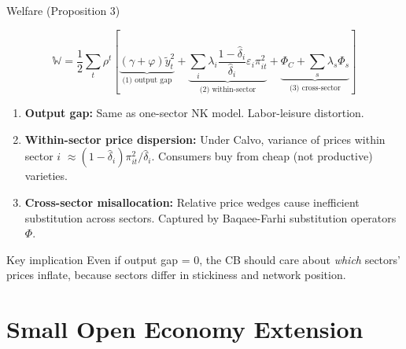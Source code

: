 \documentclass[aspectratio=169]{beamer}
\begin{document}
\begin{frame}{Welfare (Proposition 3)}

\begin{equation*}
    \mathbb{W} = \frac{1}{2}\sum_t \rho^t \left[\underbrace{(\gamma+\varphi)\tilde{y}_t^2}_{\text{(1) output gap}} + \underbrace{\sum_i \lambda_i \frac{1-\hat{\delta}_i}{\hat{\delta}_i}\varepsilon_i\pi_{it}^2}_{\text{(2) within-sector}} + \underbrace{\Phi_C + \sum_s\lambda_s\Phi_s}_{\text{(3) cross-sector}}\right]
\end{equation*}

\vspace{0.2cm}
\begin{enumerate}
    \item \textbf{Output gap:} Same as one-sector NK model. Labor-leisure distortion.
    \vspace{0.1cm}
    \item \textbf{Within-sector price dispersion:} Under Calvo, variance of prices within sector $i$ $\approx (1-\hat{\delta}_i)\pi_{it}^2/\hat{\delta}_i$. Consumers buy from cheap (not productive) varieties.
    \vspace{0.1cm}
    \item \textbf{Cross-sector misallocation:} Relative price wedges cause inefficient substitution across sectors. Captured by Baqaee-Farhi substitution operators $\Phi$.
\end{enumerate}

\vspace{0.2cm}
\begin{alertblock}{Key implication}
Even if output gap = 0, the CB should care about \textit{which} sectors' prices inflate, because sectors differ in stickiness and network position.
\end{alertblock}
\end{frame}

\section{Small Open Economy Extension}
\end{document}
